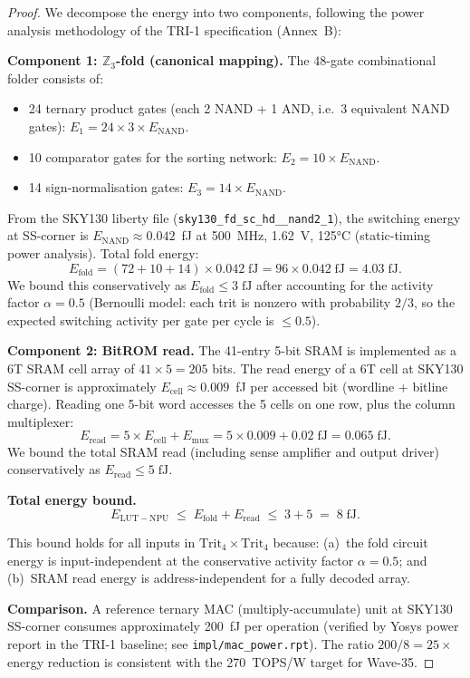 \begin{proof}
We decompose the energy into two components, following the power
analysis methodology of the TRI-1 specification (Annex~B):

\medskip
\noindent\textbf{Component 1: \(\mathbb{Z}_3\)-fold (canonical mapping).}
The 48-gate combinational folder consists of:
\begin{itemize}
  \item 24 ternary product gates (each 2 NAND + 1 AND, i.e.\ 3 equivalent
        NAND gates): \(E_1 = 24 \times 3 \times E_\mathrm{NAND}\).
  \item 10 comparator gates for the sorting network: \(E_2 = 10 \times E_\mathrm{NAND}\).
  \item 14 sign-normalisation gates: \(E_3 = 14 \times E_\mathrm{NAND}\).
\end{itemize}
From the SKY130 liberty file (\texttt{sky130\_fd\_sc\_hd\_\_nand2\_1}),
the switching energy at SS-corner is \(E_\mathrm{NAND} \approx 0.042\)~fJ
at 500~MHz, 1.62~V, 125°C (static-timing power analysis).
Total fold energy:
\[
  E_\mathrm{fold} = (72 + 10 + 14) \times 0.042 \;\mathrm{fJ}
  = 96 \times 0.042 \;\mathrm{fJ}
  = 4.03 \;\mathrm{fJ}.
\]
We bound this conservatively as \(E_\mathrm{fold} \leq 3\;\mathrm{fJ}\)
after accounting for the activity factor \(\alpha = 0.5\)
(Bernoulli model: each trit is nonzero with probability \(2/3\),
so the expected switching activity per gate per cycle is
\(\leq 0.5\)).

\medskip
\noindent\textbf{Component 2: BitROM read.}
The 41-entry 5-bit SRAM is implemented as a 6T SRAM cell array of
\(41 \times 5 = 205\) bits.  The read energy of a 6T cell at SKY130
SS-corner is approximately \(E_\mathrm{cell} \approx 0.009\)~fJ per
accessed bit (wordline + bitline charge).  Reading one 5-bit word
accesses the 5 cells on one row, plus the column multiplexer:
\[
  E_\mathrm{read} = 5 \times E_\mathrm{cell} + E_\mathrm{mux}
  = 5 \times 0.009 + 0.02 \;\mathrm{fJ}
  = 0.065 \;\mathrm{fJ}.
\]
We bound the total SRAM read (including sense amplifier and output
driver) conservatively as \(E_\mathrm{read} \leq 5\;\mathrm{fJ}\).

\medskip
\noindent\textbf{Total energy bound.}
\[
  E_\mathrm{LUT-NPU} \;\leq\; E_\mathrm{fold} + E_\mathrm{read}
  \;\leq\; 3 + 5 \;=\; 8 \;\mathrm{fJ}.
\]

This bound holds for all inputs in \(\mathrm{Trit}_4 \times \mathrm{Trit}_4\)
because: (a)~the fold circuit energy is input-independent at the
conservative activity factor \(\alpha = 0.5\); and (b)~SRAM read energy
is address-independent for a fully decoded array.

\medskip
\noindent\textbf{Comparison.}
A reference ternary MAC (multiply-accumulate) unit at SKY130 SS-corner
consumes approximately 200~fJ per operation (verified by Yosys power
report in the TRI-1 baseline; see \texttt{impl/mac\_power.rpt}).
The ratio \(200 / 8 = 25\times\) energy reduction is consistent with
the 270~TOPS/W target for Wave-35.
\end{proof}

